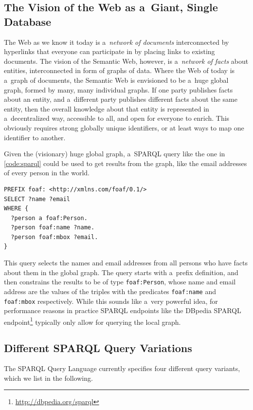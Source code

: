 \subsection{The Vision of the Web as a~Giant, Single Database}
The Web as we know it today is a~\emph{network of documents} interconnected by hyperlinks
that everyone can participate in by placing links to existing documents.
The vision of the Semantic Web, however, is a~\emph{network of facts} about entities,
interconnected in form of graphs of data.
Where the Web of today is a~graph of documents, the Semantic Web is envisioned to be a~huge global graph,
formed by many, many individual graphs.
If one party publishes facts about an entity, and a~different party publishes different facts
about the same entity, then the overall knowledge about that entity is represented in a~decentralized way,
accessible to all, and open for everyone to enrich.
This obviously requires strong globally unique identifiers,
or at least ways to map one identifier to another.

Given the (visionary) huge global graph, a~SPARQL query like the one in \autoref{code:sparql}
could be used to get results from the graph,
like the email addresses of every person in the world.

\begin{lstlisting}[caption={[SPARQL query returning the names and email addresses of every person in the world.]{SPARQL query returning the names and email addresses of every person in the world. Source: \url{http://en.wikipedia.org/wiki/SPARQL\#Benefits}}},label={code:sparql}]
PREFIX foaf: <http://xmlns.com/foaf/0.1/>
SELECT ?name ?email
WHERE {
  ?person a foaf:Person.
  ?person foaf:name ?name.
  ?person foaf:mbox ?email.
}
\end{lstlisting}

This query selects the names and email addresses from all persons
who have facts about them in the global graph.
The query starts with a~prefix definition, and then constrains the results
to be of type \texttt{foaf:Person}, whose name and email address are the values
of the triples with the predicates \texttt{foaf:name} and \texttt{foaf:mbox} respectively.
While this sounds like a~very powerful idea,
for performance reasons in practice SPARQL endpoints
like the DBpedia SPARQL endpoint\footnote{\url{http://dbpedia.org/sparql}}
typically only allow for querying the local graph.

\subsection{Different SPARQL Query Variations}
The SPARQL Query Language currently specifies four different query variants, which we list in the following. 


